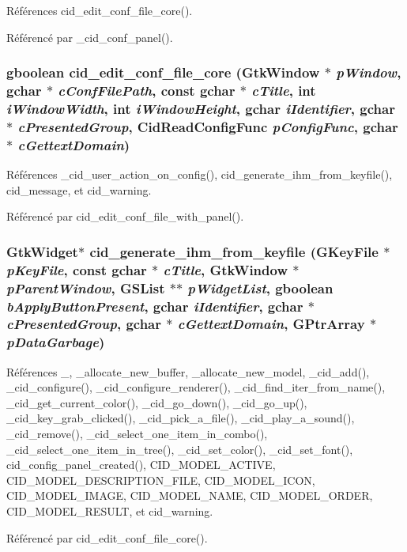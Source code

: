 Références cid\_\-edit\_\-conf\_\-file\_\-core().

Référencé par \_\-cid\_\-conf\_\-panel().
\subsubsection{\setlength{\rightskip}{0pt plus 5cm}gboolean cid\_\-edit\_\-conf\_\-file\_\-core (GtkWindow $\ast$ {\em pWindow}, \/  gchar $\ast$ {\em cConfFilePath}, \/  const gchar $\ast$ {\em cTitle}, \/  int {\em iWindowWidth}, \/  int {\em iWindowHeight}, \/  gchar {\em iIdentifier}, \/  gchar $\ast$ {\em cPresentedGroup}, \/  {\bf CidReadConfigFunc} {\em pConfigFunc}, \/  gchar $\ast$ {\em cGettextDomain})}\label{cid-conf-panel-factory_8h_d634715d7795c19e064e4c29dd9b3632}




Références \_\-cid\_\-user\_\-action\_\-on\_\-config(), cid\_\-generate\_\-ihm\_\-from\_\-keyfile(), cid\_\-message, et cid\_\-warning.

Référencé par cid\_\-edit\_\-conf\_\-file\_\-with\_\-panel().
\subsubsection{\setlength{\rightskip}{0pt plus 5cm}GtkWidget$\ast$ cid\_\-generate\_\-ihm\_\-from\_\-keyfile (GKeyFile $\ast$ {\em pKeyFile}, \/  const gchar $\ast$ {\em cTitle}, \/  GtkWindow $\ast$ {\em pParentWindow}, \/  GSList $\ast$$\ast$ {\em pWidgetList}, \/  gboolean {\em bApplyButtonPresent}, \/  gchar {\em iIdentifier}, \/  gchar $\ast$ {\em cPresentedGroup}, \/  gchar $\ast$ {\em cGettextDomain}, \/  GPtrArray $\ast$ {\em pDataGarbage})}\label{cid-conf-panel-factory_8h_328a8204fa685a6187fc6a6422d1261b}




Références \_\-, \_\-allocate\_\-new\_\-buffer, \_\-allocate\_\-new\_\-model, \_\-cid\_\-add(), \_\-cid\_\-configure(), \_\-cid\_\-configure\_\-renderer(), \_\-cid\_\-find\_\-iter\_\-from\_\-name(), \_\-cid\_\-get\_\-current\_\-color(), \_\-cid\_\-go\_\-down(), \_\-cid\_\-go\_\-up(), \_\-cid\_\-key\_\-grab\_\-clicked(), \_\-cid\_\-pick\_\-a\_\-file(), \_\-cid\_\-play\_\-a\_\-sound(), \_\-cid\_\-remove(), \_\-cid\_\-select\_\-one\_\-item\_\-in\_\-combo(), \_\-cid\_\-select\_\-one\_\-item\_\-in\_\-tree(), \_\-cid\_\-set\_\-color(), \_\-cid\_\-set\_\-font(), cid\_\-config\_\-panel\_\-created(), CID\_\-MODEL\_\-ACTIVE, CID\_\-MODEL\_\-DESCRIPTION\_\-FILE, CID\_\-MODEL\_\-ICON, CID\_\-MODEL\_\-IMAGE, CID\_\-MODEL\_\-NAME, CID\_\-MODEL\_\-ORDER, CID\_\-MODEL\_\-RESULT, et cid\_\-warning.

Référencé par cid\_\-edit\_\-conf\_\-file\_\-core().
